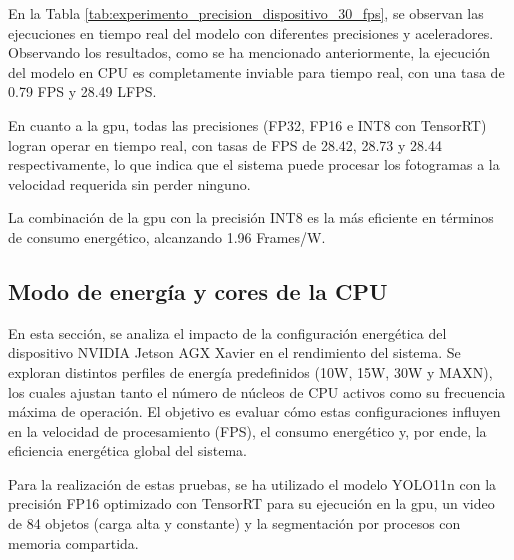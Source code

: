 \documentclass[11pt,spanish,listoffigures,listoftables]{tfgetsinf}
\begin{document}
   En la Tabla \ref{tab:experimento_precision_dispositivo_30_fps}, se observan las ejecuciones en tiempo real del modelo con diferentes precisiones y aceleradores. Observando los resultados, como se ha mencionado anteriormente, la ejecución del modelo en CPU es completamente inviable para tiempo real, con una tasa de 0.79 FPS y 28.49 LFPS.

   En cuanto a la \gls{gpu}, todas las precisiones (FP32, FP16 e INT8 con TensorRT) logran operar en tiempo real, con tasas de FPS de 28.42, 28.73 y 28.44 respectivamente, lo que indica que el sistema puede procesar los fotogramas a la velocidad requerida sin perder ninguno.

   La combinación de la \gls{gpu} con la precisión INT8 es la más eficiente en términos de consumo energético, alcanzando 1.96 Frames/W.

   \subsection{Modo de energía y cores de la CPU} \label{sub:modo_energia}
   En esta sección, se analiza el impacto de la configuración energética del dispositivo NVIDIA Jetson AGX Xavier en el rendimiento del sistema. Se exploran distintos perfiles de energía predefinidos (10W, 15W, 30W y MAXN), los cuales ajustan tanto el número de núcleos de CPU activos como su frecuencia máxima de operación. El objetivo es evaluar cómo estas configuraciones influyen en la velocidad de procesamiento (FPS), el consumo energético y, por ende, la eficiencia energética global del sistema.

   Para la realización de estas pruebas, se ha utilizado el modelo YOLO11n con la precisión FP16 optimizado con TensorRT para su ejecución en la \gls{gpu}, un video de 84 objetos (carga alta y constante) y la segmentación por procesos con memoria compartida.
\end{document}
